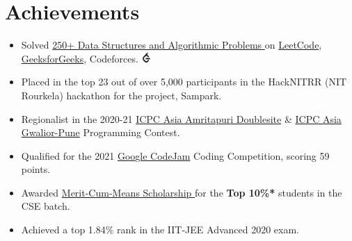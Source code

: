 \documentclass[letterpaper,10.5pt]{article}
\newcommand{\resumeItemWithoutTitle}[1]{
  \item\small{
  {#1 \vspace{-2pt}}
    {\vspace{-2pt}}
  }
}
\newcommand{\resumeItemListStart}{\begin{itemize}}
\newcommand{\resumeItemListEnd}{\end{itemize}\vspace{-5pt}}
\begin{document}
\section{Achievements}
\resumeItemListStart
\resumeItemWithoutTitle
{Solved \href{https://github.com/AyushR1/DSA-QA/}{250+  Data Structures and Algorithmic {Problems} \faIcon{external-link-alt}}  on 
\href{https://leetcode.com/AyushR1/}{LeetCode}, 
\href{https://auth.geeksforgeeks.org/user/ayushr1_gfg}{{GeeksforGeeks}}, Codeforces.
\hfill
\href{https://www.linkedin.com/in/ayushr1}{\includegraphics[height=10pt,width=10pt]{leetcode.png}}  
\href{https://auth.geeksforgeeks.org/user/ayushr1_gfg}{\faIcon{poll}}}
\resumeItemWithoutTitle
{Placed in the top 23 out of over 5,000 participants in the HackNITRR (NIT Rourkela) hackathon for the project, Sampark. 
\hfill
\href{https://devfolio.co/projects/sampark-8705}{}}
\resumeItemWithoutTitle
{Regionalist in the 2020-21 \href{https://drive.google.com/file/d/166f0APz01XpxkFRC2Jj-MZfdezvqN_cL/view?usp=sharing}{ICPC Asia Amritapuri Doublesite} \& \href{https://drive.google.com/file/d/12iHnk-QTFNEFMlT0RtzUQPJx-VE-aazo/view?usp=sharing}{{ICPC Asia Gwalior-Pune}} Programming Contest.\href{https://drive.google.com/drive/folders/1hOZy-qfPRcbJtT9_0KVmIQzabxIpurpy?usp=sharing}{\hfill{}}}
\resumeItemWithoutTitle
{Qualified for the 2021 \href{https://drive.google.com/file/d/1dZ_wFBDmbI-wAKbAvBAo_n1-ssqiqFjs/view?usp=sharing}{{Goo}gle CodeJam} Coding Competition, scoring 59 points.\href{https://drive.google.com/file/d/1dZ_wFBDmbI-wAKbAvBAo_n1-ssqiqFjs/view?usp=sharing}{\hfill {}}}
\resumeItemWithoutTitle
{Awarded \href{https://drive.google.com/file/d/15pTlVu3U5WDSyJxvZSGFACwZ2aaa9Cs1/view?usp=share_link}{Merit-Cum-Means Scholarship } for the \textbf{Top 10\%*} students in the CSE batch.\href{https://drive.google.com/file/d/15pTlVu3U5WDSyJxvZSGFACwZ2aaa9Cs1/view?usp=share_link}{\hfill{}}}
\resumeItemWithoutTitle
{Achieved a top 1.84\% rank in the IIT-JEE Advanced 2020 exam.\href{https://drive.google.com/file/d/15pTlVu3U5WDSyJxvZSGFACwZ2aaa9Cs1/view?usp=share_link}{\hfill\faIcon{certificate}}}
\resumeItemListEnd

\end{document}
